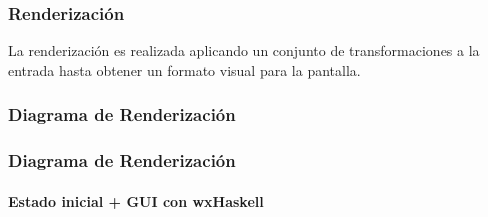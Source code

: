 \documentclass[12pt]{beamer}
\begin{document}
\begin{frame}
\frametitle{Renderización}
La renderización es realizada aplicando un conjunto de transformaciones a la entrada
hasta obtener un formato visual para la pantalla.

\begin{figure}
\end{figure}
\end{frame}

\subsubsection{Diagrama de Renderización}
\begin{frame}
\frametitle{Diagrama de Renderización}
\framesubtitle{Estado inicial + GUI con wxHaskell}
\end{frame}
\end{document}
